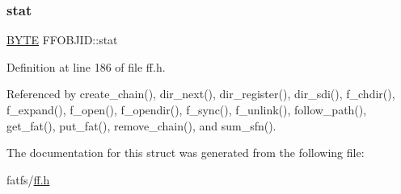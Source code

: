 \subsubsection{\texorpdfstring{stat}{stat}}
{\footnotesize\ttfamily \hyperlink{ff_8h_a4ae1dab0fb4b072a66584546209e7d58}{B\+Y\+TE} F\+F\+O\+B\+J\+I\+D\+::stat}



Definition at line 186 of file ff.\+h.



Referenced by create\+\_\+chain(), dir\+\_\+next(), dir\+\_\+register(), dir\+\_\+sdi(), f\+\_\+chdir(), f\+\_\+expand(), f\+\_\+open(), f\+\_\+opendir(), f\+\_\+sync(), f\+\_\+unlink(), follow\+\_\+path(), get\+\_\+fat(), put\+\_\+fat(), remove\+\_\+chain(), and sum\+\_\+sfn().



The documentation for this struct was generated from the following file\+:\begin{DoxyCompactItemize}
\item 
fatfs/\hyperlink{ff_8h}{ff.\+h}\end{DoxyCompactItemize}
